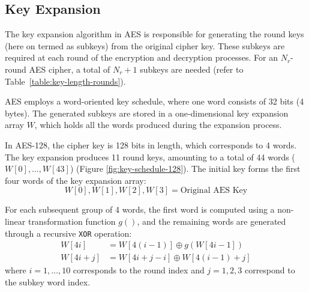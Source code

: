 \subsection{Key Expansion}
\label{sec:key-expansion}

The key expansion algorithm in \gls{AES} is responsible for generating the round keys (here on termed as subkeys) from the original cipher key. 
These subkeys are required at each round of the encryption and decryption processes. 
For an $N_r$-round \gls{AES} cipher, a total of $N_r + 1$ subkeys are needed (refer to Table~\ref{table:key-length-rounds}).

AES employs a word-oriented key schedule, where one word consists of 32 bits (4 bytes).
The generated subkeys are stored in a one-dimensional key expansion array $W$, which holds all the words produced during the expansion process.

In AES-128, the cipher key is 128 bits in length, which corresponds to 4 words. 
The key expansion produces 11 round keys, amounting to a total of 44 words ($W[0], \dots, W[43]$) (Figure \ref{fig:key-schedule-128}).
The initial key forms the first four words of the key expansion array:
\begin{equation}
    W[0], W[1], W[2], W[3] = \text{Original AES Key}
\end{equation}

For each subsequent group of 4 words, the first word is computed using a non-linear transformation function $g()$, and the remaining words are generated through a recursive \texttt{XOR} operation:
\begin{align}
    W[4i] &= W[4(i-1)] \oplus g(W[4i-1])\\
    W[4i+j] &= W[4i+j-i] \oplus W[4(i-1)+j]
\end{align}
where $i = 1,\dots,10$ corresponds to the round index and $j=1,2,3$ correspond to the subkey word index.

